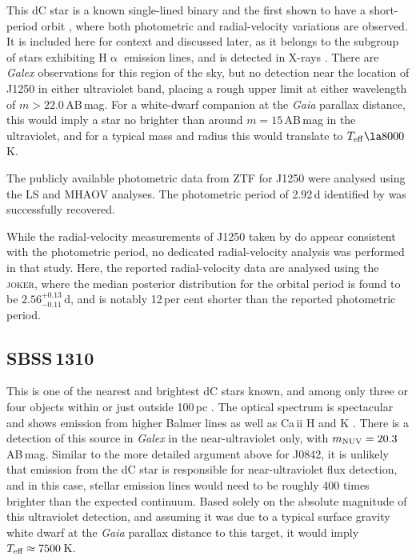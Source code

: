 \documentclass[fleqn,usenatbib,useAMS]{mnras}
\begin{document}
This dC star is a known single-lined binary and the first shown to have a short-period orbit \citep{Margon18}, where both photometric and radial-velocity variations are observed.  It is included here for context and discussed later, as it belongs to the subgroup of stars exhibiting H$\upalpha$ emission lines, and is detected in X-rays \citep{Green19}.  There are {\em Galex} observations for this region of the sky, but no detection near the location of J1250 in either ultraviolet band, placing a rough upper limit at either wavelength of $m>22.0$\,AB\,mag.  For a white-dwarf companion at the {\em Gaia} parallax distance, this would imply a star no brighter than around $m=15$\,AB\,mag in the ultraviolet, and for a typical mass and radius this would translate to $T_{\rm eff}\la8000$\,K.

The publicly available photometric data from ZTF for J1250 were analysed using the LS and MHAOV analyses.  The photometric period of 2.92\,d identified by \cite{Margon18} was successfully recovered.  

While the radial-velocity measurements of J1250 taken by \cite{Margon18} do appear consistent with the photometric period, no dedicated radial-velocity analysis was performed in that study.  Here, the reported radial-velocity data are analysed using the \textsc{joker}, where the median posterior distribution for the orbital period is found to be $2.56^{+0.13}_{-0.11}$\,d, and is notably 12\,per cent shorter than the reported photometric period.


\subsection{SBSS\,1310}
\label{subsec:sbssp}

This is one of the nearest and brightest dC stars known, and among only three or four objects within or just outside 100\,pc \citep{Harris18}.  The optical spectrum is spectacular and shows emission from higher Balmer lines as well as Ca\,{\sc ii} H and K \citep{Rossi2011}.  There is a detection of this source in {\em Galex} in the near-ultraviolet only, with $m_{\rm NUV}=20.3$\,AB\,mag.  Similar to the more detailed argument above for J0842, it is unlikely that emission from the dC star is responsible for near-ultraviolet flux detection, and in this case, stellar emission lines would need to be roughly 400 times brighter than the expected continuum.  Based solely on the absolute magnitude of this ultraviolet detection, and assuming it was due to a typical surface gravity white dwarf at the {\em Gaia} parallax distance to this target, it would imply $T_{\rm eff}\approx7500$\,K.  
\end{document}
